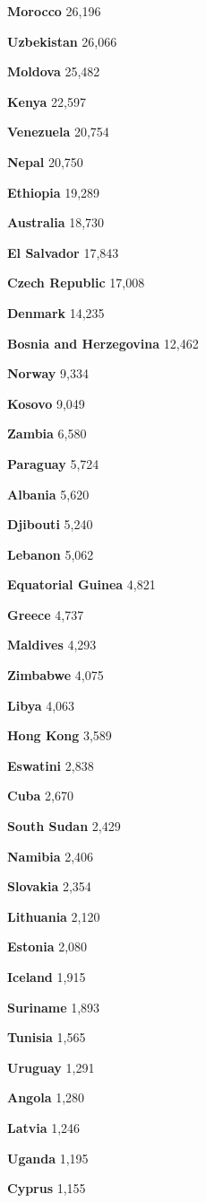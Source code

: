 \textbf{Morocco} 26,196

\textbf{Uzbekistan} 26,066

\textbf{Moldova} 25,482

\textbf{Kenya} 22,597

\textbf{Venezuela} 20,754

\textbf{Nepal} 20,750

\textbf{Ethiopia} 19,289

\textbf{Australia} 18,730

\textbf{El Salvador} 17,843

\textbf{Czech Republic} 17,008

\textbf{Denmark} 14,235

\textbf{Bosnia and Herzegovina} 12,462

\textbf{Norway} 9,334

\textbf{Kosovo} 9,049

\textbf{Zambia} 6,580

\textbf{Paraguay} 5,724

\textbf{Albania} 5,620

\textbf{Djibouti} 5,240

\textbf{Lebanon} 5,062

\textbf{Equatorial Guinea} 4,821

\textbf{Greece} 4,737

\textbf{Maldives} 4,293

\textbf{Zimbabwe} 4,075

\textbf{Libya} 4,063

\textbf{Hong Kong} 3,589

\textbf{Eswatini} 2,838

\textbf{Cuba} 2,670

\textbf{South Sudan} 2,429

\textbf{Namibia} 2,406

\textbf{Slovakia} 2,354

\textbf{Lithuania} 2,120

\textbf{Estonia} 2,080

\textbf{Iceland} 1,915

\textbf{Suriname} 1,893

\textbf{Tunisia} 1,565

\textbf{Uruguay} 1,291

\textbf{Angola} 1,280

\textbf{Latvia} 1,246

\textbf{Uganda} 1,195

\textbf{Cyprus} 1,155

